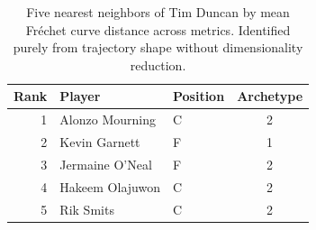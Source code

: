 \begin{table}[htbp]
  \centering\small
  \begin{tabular}{rllc}
    \toprule
    Rank & Player & Position & Archetype \\
    \midrule
    1 & Alonzo Mourning & C & 2 \\
    2 & Kevin Garnett & F & 1 \\
    3 & Jermaine O'Neal & F & 2 \\
    4 & Hakeem Olajuwon & C & 2 \\
    5 & Rik Smits & C & 2 \\
    \bottomrule
  \end{tabular}
  \caption{Five nearest neighbors of Tim Duncan by mean Fr\'{e}chet curve distance across metrics. Identified purely from trajectory shape without dimensionality reduction.}
  \label{tab:Tim_Duncan_frechet_curve_neighbors}
\end{table}

